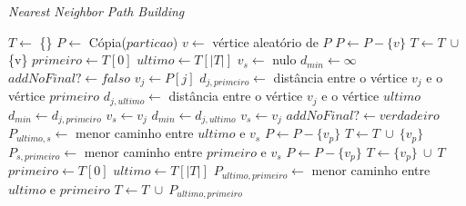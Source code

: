 \begin{algorithm}                   %
	\caption{\textit{Nearest Neighbor Path Building}}          %
	\label{nearest_neighbor}                           %
	\begin{algorithmic}[1]                   %
		\newline
		\State $T \gets $ \{\} 
		\State $P \gets $ Cópia($particao$)
		\State $v \gets $ vértice aleatório de $P$
		\State $P \gets P - \{v\}$
		\State $T \gets T\ \cup $ \{v\}
			\State $primeiro \gets T[0]$
			\State $ultimo \gets T[|T|]$
			\State $v_{s} \gets $ nulo 
			\State $d_{min} \gets \infty$
			\State $addNoFinal? \gets falso$
				\State $v_{j} \gets P[j]$
				\State $d_{j,primeiro} \gets $ distância entre o vértice $v_{j}$ e o vértice $primeiro$
				\State $d_{j,ultimo} \gets $ distância entre o vértice $v_{j}$ e o vértice $ultimo$
					\State $d_{min} \gets d_{j,primeiro}$
					\State $v_{s} \gets v_{j}$
				\EndIf
					\State $d_{min} \gets d_{j,ultimo}$
					\State $v_{s} \gets v_{j}$
					\State $addNoFinal? \gets verdadeiro$
				\EndIf
			\EndFor
				\State $P_{ultimo,s} \gets $ menor caminho entre $ultimo$ e $v_{s}$
					\State $P \gets P - \{v_{p}\}$
					\State $T \gets T\ \cup\ \{v_{p}\}$
				\EndFor
			\Else
				\State $P_{s,primeiro} \gets $ menor caminho entre $primeiro$ e $v_{s}$
					\State $P \gets P - \{v_{p}\}$
					\State $T \gets \{v_{p}\}\ \cup\ T$
				\EndFor
			\EndIf
		\EndWhile
		\State $primeiro \gets T[0]$
		\State $ultimo \gets T[|T|]$
		\State $P_{ultimo,primeiro} \gets $ menor caminho entre $ultimo$ e $primeiro$
		\State $T \gets T\ \cup\ P_{ultimo,primeiro}$
		\EndProcedure
	\end{algorithmic}
\end{algorithm}


